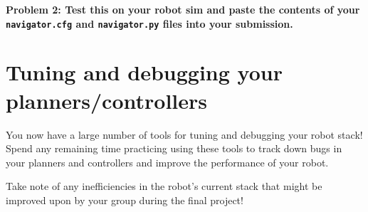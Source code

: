 \documentclass{article}
\begin{document}
{\bf Problem 2: Test this on your robot sim and paste the contents of your \texttt{navigator.cfg} and \texttt{navigator.py} files into your submission.}

\section{Tuning and debugging your planners/controllers}
You now have a large number of tools for tuning and debugging your robot stack! Spend any remaining time practicing using these tools to track down bugs in your planners and controllers and improve the performance of your robot.

Take note of any inefficiencies in the robot's current stack that might be improved upon by your group during the final project!
\end{document}

